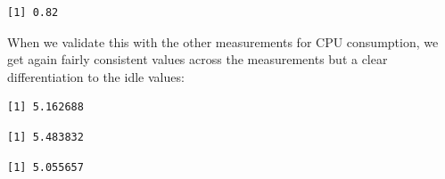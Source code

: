 \begin{Shaded}
\begin{Highlighting}[]
\SpecialCharTok{\$}
\end{Highlighting}
\end{Shaded}

\begin{verbatim}
[1] 0.82
\end{verbatim}

When we validate this with the other measurements for CPU consumption, we get again fairly consistent values across the measurements but a clear differentiation
to the idle values:

\begin{Shaded}
\begin{Highlighting}[]
\SpecialCharTok{\$}
\end{Highlighting}
\end{Shaded}

\begin{verbatim}
[1] 5.162688
\end{verbatim}

\begin{Shaded}
\begin{Highlighting}[]
\SpecialCharTok{\$}
\end{Highlighting}
\end{Shaded}

\begin{verbatim}
[1] 5.483832
\end{verbatim}

\begin{Shaded}
\begin{Highlighting}[]
\SpecialCharTok{\$}
\end{Highlighting}
\end{Shaded}

\begin{verbatim}
[1] 5.055657
\end{verbatim}

\begin{Shaded}
\begin{Highlighting}[]
\SpecialCharTok{\$}
\end{Highlighting}
\end{Shaded}

